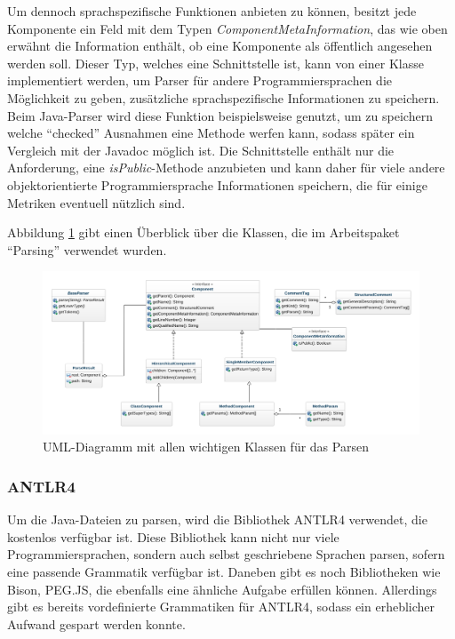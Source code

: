 Um dennoch sprachspezifische Funktionen anbieten zu können, besitzt jede Komponente ein Feld mit dem Typen \textit{ComponentMetaInformation}, das wie oben erwähnt die Information enthält, ob eine Komponente als öffentlich angesehen werden soll. Dieser Typ, welches eine Schnittstelle ist, kann von einer Klasse implementiert werden, um Parser für andere Programmiersprachen die Möglichkeit zu geben, zusätzliche sprachspezifische Informationen zu speichern. Beim Java-Parser wird diese Funktion beispielsweise genutzt, um zu speichern welche \enquote{checked} Ausnahmen eine Methode werfen kann, sodass später ein Vergleich mit der Javadoc möglich ist. Die Schnittstelle enthält nur die Anforderung, eine \textit{isPublic}-Methode anzubieten und kann daher für viele andere objektorientierte Programmiersprache Informationen speichern, die für einige Metriken eventuell nützlich sind. 

Abbildung \ref{fig:uml_parsing} gibt einen Überblick über die Klassen, die im Arbeitspaket \enquote{Parsing} verwendet wurden.
\begin{figure}
    \centering
    \includegraphics[width=\columnwidth]{figures/uml/parsing.png}
    \caption{UML-Diagramm mit allen wichtigen Klassen für das Parsen}
    \label{fig:uml_parsing}
\end{figure}

\subsubsection{ANTLR4}
Um die Java-Dateien zu parsen, wird die Bibliothek ANTLR4 verwendet, die kostenlos verfügbar ist. Diese Bibliothek kann nicht nur viele Programmiersprachen, sondern auch selbst geschriebene Sprachen parsen, sofern eine passende Grammatik verfügbar ist. Daneben gibt es noch Bibliotheken wie Bison, PEG.JS, die ebenfalls eine ähnliche Aufgabe erfüllen können. Allerdings gibt es bereits vordefinierte Grammatiken für ANTLR4, sodass ein erheblicher Aufwand gespart werden konnte.  

